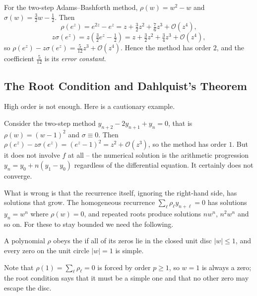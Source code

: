 \documentclass[a4paper]{scrartcl}
\providecommand{\abs}[1]{\left\lvert#1\right\rvert}
\renewcommand{\abs}[1]{\left\lvert#1\right\rvert}
\begin{document}
\begin{example}
  For the two-step Adams--Bashforth method, $\rho(w) = w^2 - w$ and $\sigma(w) = \tfrac32 w - \tfrac12$. Then
  $$
  \rho(e^z) = e^{2z} - e^z = z + \tfrac32 z^2 + \tfrac76 z^3 + \mathcal{O}(z^4),
  $$
  $$
  z\sigma(e^z) = z\left(\tfrac32 e^z - \tfrac12\right) = z + \tfrac32 z^2 + \tfrac34 z^3 + \mathcal{O}(z^4),
  $$
  so $\rho(e^z) - z\sigma(e^z) = \tfrac{5}{12}z^3 + \mathcal{O}(z^4)$. Hence the method has order $2$, and the coefficient $\tfrac{5}{12}$ is its \emph{error constant}.
\end{example}

\subsection{The Root Condition and Dahlquist's Theorem}

High order is not enough. Here is a cautionary example.

\begin{example}
  Consider the two-step method $y_{n+2} - 2y_{n+1} + y_n = 0$, that is $\rho(w) = (w-1)^2$ and $\sigma \equiv 0$. Then $\rho(e^z) - z\sigma(e^z) = (e^z-1)^2 = z^2 + \mathcal{O}(z^3)$, so the method has order $1$. But it does not involve $f$ at all -- the numerical solution is the arithmetic progression $y_n = y_0 + n(y_1 - y_0)$ regardless of the differential equation. It certainly does not converge.
\end{example}

What is wrong is that the recurrence itself, ignoring the right-hand side, has solutions that grow. The homogeneous recurrence $\sum_\ell \rho_\ell y_{n+\ell} = 0$ has solutions $y_n = w^n$ where $\rho(w) = 0$, and repeated roots produce solutions $n w^n$, $n^2w^n$ and so on. For these to stay bounded we need the following.

\begin{definition}
  A polynomial $\rho$ obeys the  if all of its zeros lie in the closed unit disc $\abs{w}\leq 1$, and every zero on the unit circle $\abs{w} = 1$ is simple.
\end{definition}

Note that $\rho(1) = \sum_\ell \rho_\ell = 0$ is forced by order $p \geq 1$, so $w = 1$ is always a zero; the root condition says that it must be a simple one and that no other zero may escape the disc.
\end{document}
